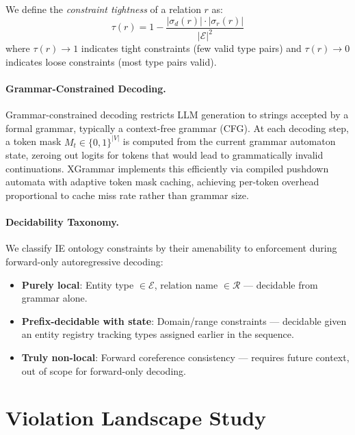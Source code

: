 \documentclass[11pt,a4paper]{article}
\begin{document}
We define the \emph{constraint tightness} of a relation $r$ as:
\begin{equation}
\tau(r) = 1 - \frac{|\sigma_d(r)| \cdot |\sigma_r(r)|}{|\mathcal{E}|^2}
\end{equation}
where $\tau(r) \to 1$ indicates tight constraints (few valid type pairs) and $\tau(r) \to 0$ indicates loose constraints (most type pairs valid).

\paragraph{Grammar-Constrained Decoding.}
Grammar-constrained decoding restricts LLM generation to strings accepted by a formal grammar, typically a context-free grammar (CFG).
At each decoding step, a token mask $M_t \in \{0,1\}^{|V|}$ is computed from the current grammar automaton state, zeroing out logits for tokens that would lead to grammatically invalid continuations.
XGrammar \cite{dong2024xgrammar} implements this efficiently via compiled pushdown automata with adaptive token mask caching, achieving per-token overhead proportional to cache miss rate rather than grammar size.

\paragraph{Decidability Taxonomy.}
We classify IE ontology constraints by their amenability to enforcement during forward-only autoregressive decoding:
\begin{itemize}[leftmargin=*,nosep]
\item \textbf{Purely local}: Entity type $\in \mathcal{E}$, relation name $\in \mathcal{R}$ --- decidable from grammar alone.
\item \textbf{Prefix-decidable with state}: Domain/range constraints --- decidable given an entity registry tracking types assigned earlier in the sequence.
\item \textbf{Truly non-local}: Forward coreference consistency --- requires future context, out of scope for forward-only decoding.
\end{itemize}

\section{Violation Landscape Study}
\label{sec:landscape}
\end{document}
